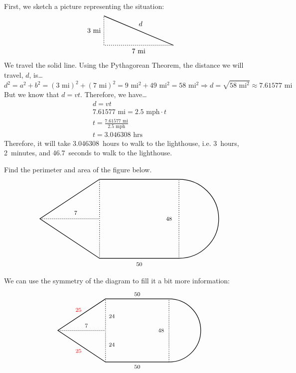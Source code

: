 \documentclass[12pt,letterpaper]{exam}
\begin{document}
\begin{questions}
\sol First, we sketch a picture representing the situation:
	\[
	\begin{tikzpicture}
	\node at (-1.75,-0.3) {7~mi}; 
	\node at (-4.0,0.75) {3~mi};
	\node at (-1.65,1.1) {$d$};
	\draw[line width=0.03cm,dotted] (0,0) -- (-7/2,0) -- (-7/2,3/2);
	\draw[line width=0.03cm] (0,0) -- (-7/2,3/2);
	\end{tikzpicture}
	\]
We travel the solid line. Using the Pythagorean Theorem, the distance we will travel, $d$, is\dots
	\[
	d^2= a^2 + b^2= (3 \text{ mi})^2 + (7 \text{ mi})^2= 9 \text{ mi}^2 + 49 \text{ mi}^2= 58 \text{ mi}^2 \Longrightarrow d= \sqrt{58 \text{ mi}^2} \approx 7.61577 \text{ mi}
	\]
But we know that $d= vt$. Therefore, we have\dots \pspace
	\[
	\begin{gathered}
	d= vt \\[0.3cm]
	7.61577 \text{ mi}= 2.5 \text{ mph} \cdot t \\[0.3cm]
	t= \frac{7.61577 \text{ mi}}{2.5 \text{ mph}} \\[0.3cm]
	t= 3.046308 \text{ hrs}
	\end{gathered}
	\] \pspace
Therefore, it will take 3.046308~hours to walk to the lighthouse, i.e. 3~hours, 2~minutes, and 46.7~seconds to walk to the lighthouse. 



\newpage
\question[5] Find the perimeter and area of the figure below. 
	\[
	\begin{tikzpicture}
	\draw[line width=0.03cm] (4,-2) -- (0,-2) -- (-3,0) -- (0,2) -- (4,2);
	\draw[line width=0.03cm] (4,-2) arc(-90:90:2);
	
	\draw[line width=0.03cm,dotted] (-3,0) -- (0,0);
	\draw[line width=0.03cm,dotted] (0,-2) -- (0,2);
	\draw[line width=0.03cm,dotted] (4,-2) -- (4,2);
	
	\node at (-1.2,0.3) {\footnotesize 7};
	\node at (2,-2.3) {\footnotesize 50};
	\node at (3.5,0) {\footnotesize 48};
	\end{tikzpicture}
	\] \pspace

\sol We can use the symmetry of the diagram to fill it a bit more information:
	\[
	\begin{tikzpicture}[scale=0.8]
	\draw[line width=0.03cm] (4,-2) -- (0,-2) -- (-3,0) -- (0,2) -- (4,2);
	\draw[line width=0.03cm] (4,-2) arc(-90:90:2);
	
	\draw[line width=0.03cm,dotted] (-3,0) -- (0,0);
	\draw[line width=0.03cm,dotted] (0,-2) -- (0,2);
	\draw[line width=0.03cm,dotted] (4,-2) -- (4,2);
	
	\node at (-1.2,0.3) {\footnotesize 7};
	\node at (2,-2.3) {\footnotesize 50};
	\node at (3.5,0) {\footnotesize 48};
	\node at (0.4,0.9) {\footnotesize 24};
	\node at (0.4,-0.9) {\footnotesize 24};
	\node at (2,2.3) {\footnotesize 50};
	\node at (-1.7,1.3) {\footnotesize \color{red} 25};
	\node at (-1.7,-1.3) {\footnotesize \color{red} 25};
	\end{tikzpicture}
	\] 


\end{questions}
\end{document}

